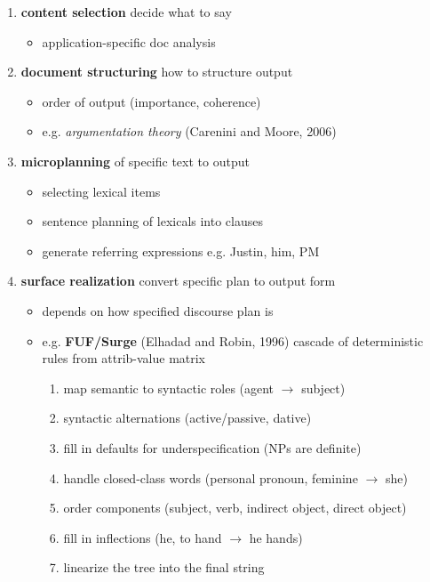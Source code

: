 \documentclass[]{article}
\theoremstyle{definition}
\begin{document}
\begin{enumerate}
    \item \textbf{content selection} decide what to say
        \begin{itemize}
            \item application-specific doc analysis
        \end{itemize}
    \item \textbf{document structuring} how to structure output
        \begin{itemize}
            \item order of output (importance, coherence)
            \item e.g. \textit{argumentation theory} (Carenini and Moore, 2006)
        \end{itemize}
    \item \textbf{microplanning} of specific text to output
        \begin{itemize}
            \item selecting lexical items
            \item sentence planning of lexicals into clauses
            \item generate referring expressions e.g. Justin, him, PM
        \end{itemize}
    \item \textbf{surface realization} convert specific plan to output form
        \begin{itemize}
            \item depends on how specified discourse plan is
            \item e.g. \textbf{FUF/Surge} (Elhadad and Robin, 1996) cascade of deterministic rules from attrib-value matrix
            \begin{enumerate}
                \item map semantic to syntactic roles (agent $\to$ subject)
                \item syntactic alternations (active/passive, dative)
                \item fill in defaults for underspecification (NPs are definite)
                \item handle closed-class words (personal pronoun, feminine $\to$ she)
                \item order components (subject, verb, indirect object, direct object)
                \item fill in inflections (he, to hand $\to$ he hands)
                \item linearize the tree into the final string
            \end{enumerate}
        \end{itemize}
\end{enumerate}
\end{document}
